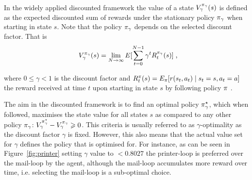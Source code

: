\documentclass[envcountsame]{llncs}
\newcommand\MS[2][r]{\ifx t#1 \textcolor{blue}{[\textbf{MS:} #2]}
  \else \begin{center}\textcolor{blue}{\textbf{MS:} #2} \end{center} \fi}
\begin{document}
In the widely applied discounted framework the value of a state \(V_{\gamma}^{\pi_{\gamma}}(s)\) is
defined as the expected discounted sum of rewards under the stationary policy \(\pi_{\gamma}\) when
starting in state \(s\). Note that the policy \(\pi_{\gamma}\) depends on the selected discount
factor. That is
\begin{align*}
  V_{\gamma}^{\pol_{\gamma}}(s)=\lim_{N \to \infty} E[\sum_{t=0}^{N-1} \gamma^{t} R_{t}^{\pol_{\gamma}}(s)]\tcom
\end{align*}

where \(0 \leqslant \gamma < 1\) is the discount factor and
\(R_{t}^{\pi}(s) = E_{\pi}[ r(s_{t},a_{t}) \mid s_{t} = s, a_{t} =
a]\) %
the reward received at time \(t\) upon starting in state \(s\) by following policy \(\pi\)
\citep{Mahadevan96_AverageRewardReinforcementLearningFoundationsAlgorithmsAndEmpiricalResults}.

The aim in the discounted framework is to find an optimal policy \(\pi^{\star}_{\gamma}\), which when
followed, maximises the state value for all states \(s\) as compared to any other policy
\(\pi_{\gamma}\): \(V_{\gamma}^{\pi^{\star}_{\gamma}} - V_{\gamma}^{\pi_{\gamma}} \geqslant 0\). This
criteria is usually referred to as \(\gamma\)-optimality as the discount factor \(\gamma\) is fixed.
However, this also means that the actual value set for \(\gamma\) defines the policy that is
optimised for. For instance, as can be seen in Figure~\ref{fig:printer} setting \(\gamma\) value to
\(<0.8027\) the printer-loop is preferred over the mail-loop by the agent, although the mail-loop
accumulates more reward over time, i.e. selecting the mail-loop is a sub-optimal choice.
\end{document}
